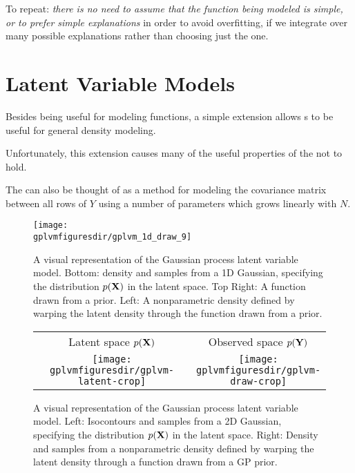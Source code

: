To repeat: \emph{there is no need to assume that the function being modeled is simple, or to prefer simple explanations} in order to avoid overfitting, if we integrate over many possible explanations rather than choosing just the one.



\section{Latent Variable Models}

Besides being useful for modeling functions, a simple extension allows \gp{}s to be useful for general density modeling.  



Unfortunately, this extension causes many of the useful properties of the \gp{} not to hold.

The \gplvm{} can also be thought of as a method for modeling the covariance matrix between all rows of $Y$ using a number of parameters which grows linearly with $N$.


\begin{figure}[t]
\begin{centering}
\texttt{[image: \\gplvmfiguresdir/gplvm\_1d\_draw\_9]}
\end{centering}
\caption[One-dimensional Gaussian process latent variable model]{A visual representation of the Gaussian process latent variable model.  Bottom: density and samples from a 1D Gaussian, specifying the distribution $p(\mathbf{X})$ in the latent space.  Top Right: A function drawn from a \gp{} prior.  Left: A nonparametric density defined by warping the latent density through the function drawn from a \gp{} prior.}  
\label{fig:oned-gplvm}
\end{figure}



\begin{figure}
\begin{centering}
{\begin{tabular}{cccc}
\phantom{h} & Latent space $p(\mathbf{X})$ & & Observed space $p(\mathbf{Y})$ \\
& \fbox{\texttt{[image: \\gplvmfiguresdir/gplvm-latent-crop]}} &
\raisebox{7em}{$\overset{\mathlarger{f(x)}}{\mathlarger{\mathlarger{\mathlarger{\mathlarger{\mathlarger{\mathlarger{\mathlarger{\rightarrow}}}}}}}}$} &
\fbox{\texttt{[image: \\gplvmfiguresdir/gplvm-draw-crop]}}
\end{tabular}}
\end{centering}
\caption[Two-dimensional Gaussian process latent variable model]{A visual representation of the Gaussian process latent variable model.  Left:  Isocontours and samples from a 2D Gaussian, specifying the distribution $p(\mathbf{X})$ in the latent space.  Right: Density and samples from a nonparametric density defined by warping the latent density through a function drawn from a GP prior.}  
\label{fig:twod-gplvm}
\end{figure}



